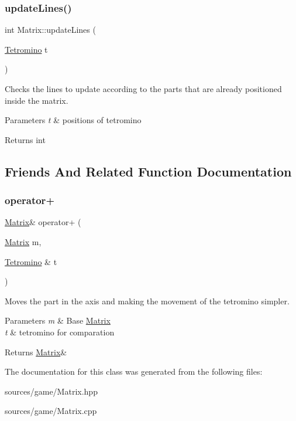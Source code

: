 \subsubsection{\texorpdfstring{update\+Lines()}{updateLines()}}
{\footnotesize\ttfamily int Matrix\+::update\+Lines (\begin{DoxyParamCaption}\item[{\hyperlink{classTetromino}{Tetromino}}]{t }\end{DoxyParamCaption})}



Checks the lines to update according to the parts that are already positioned inside the matrix. 


\begin{DoxyParams}{Parameters}
{\em t} & positions of tetromino \\
\hline
\end{DoxyParams}
\begin{DoxyReturn}{Returns}
int 
\end{DoxyReturn}


\subsection{Friends And Related Function Documentation}
\mbox{\label{classMatrix_ac1bb2cc60467d7aaa22c10217f500ec9}} 
\subsubsection{\texorpdfstring{operator+}{operator+}}
{\footnotesize\ttfamily \hyperlink{classMatrix}{Matrix}\& operator+ (\begin{DoxyParamCaption}\item[{\hyperlink{classMatrix}{Matrix}}]{m,  }\item[{\hyperlink{classTetromino}{Tetromino} \&}]{t }\end{DoxyParamCaption})\hspace{0.3cm}{\ttfamily [friend]}}



Moves the part in the axis and making the movement of the tetromino simpler. 


\begin{DoxyParams}{Parameters}
{\em m} & Base \hyperlink{classMatrix}{Matrix} \\
\hline
{\em t} & tetromino for comparation \\
\hline
\end{DoxyParams}
\begin{DoxyReturn}{Returns}
\hyperlink{classMatrix}{Matrix}\& 
\end{DoxyReturn}


The documentation for this class was generated from the following files\+:\begin{DoxyCompactItemize}
\item 
sources/game/Matrix.\+hpp\item 
sources/game/Matrix.\+cpp\end{DoxyCompactItemize}
